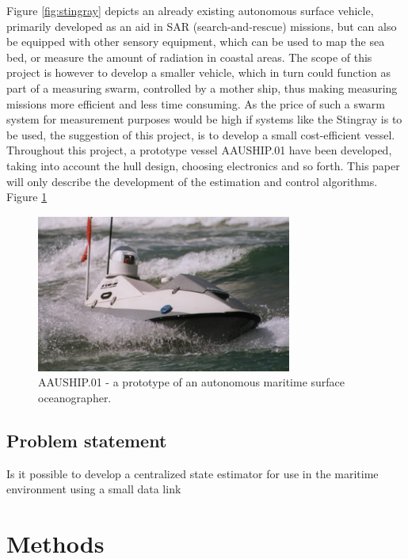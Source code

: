 \documentclass{ifacconf}
\begin{document}
Figure \ref{fig:stingray} depicts an already existing autonomous surface vehicle, primarily developed as an aid in SAR (search-and-rescue) missions, but can also be equipped with other sensory equipment, which can be used to map the sea bed, or measure the amount of radiation in coastal areas. The scope of this project is however to develop a smaller vehicle, which in turn could function as part of a measuring swarm, controlled by a mother ship, thus making measuring missions more efficient and less time consuming. As the price of such a swarm system for measurement purposes would be high if systems like the Stingray is to be used, the suggestion of this project, is to develop a small cost-efficient vessel. Throughout this project, a prototype vessel AAUSHIP.01 have been developed, taking into account the hull design, choosing electronics and so forth. This paper will only describe the development of the estimation and control algorithms. Figure \ref{fig:ship}

\begin{figure}
	\begin{center}
		\includegraphics[width=8.4cm]{img/stingray.jpg} %
		\caption{AAUSHIP.01 - a prototype of an autonomous maritime surface oceanographer.}  
		\label{fig:ship}
	\end{center}
\end{figure}

\subsection{Problem statement}
\begin{hypo} Is it possible to develop a centralized state estimator for use in the maritime environment using a small data link \end{hypo}

\section{Methods}
\end{document}
